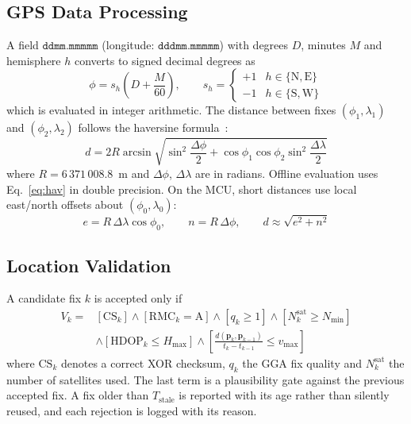 \documentclass[conference]{IEEEtran}
\begin{document}
\subsection{GPS Data Processing}
A field $\mathtt{ddmm.mmmmm}$ (longitude: $\mathtt{dddmm.mmmmm}$) with degrees $D$, minutes $M$ and hemisphere $h$ converts to signed decimal degrees as
\begin{equation}
\phi = s_h\left(D + \frac{M}{60}\right),\qquad s_h=\begin{cases}+1 & h\in\{\mathrm{N},\mathrm{E}\}\\ -1 & h\in\{\mathrm{S},\mathrm{W}\}\end{cases}
\label{eq:dd}
\end{equation}
which is evaluated in integer arithmetic. The distance between fixes $(\phi_1,\lambda_1)$ and $(\phi_2,\lambda_2)$ follows the haversine formula~\cite{sinnott1984}:
\begin{equation}
d = 2R\arcsin\sqrt{\sin^2\frac{\Delta\phi}{2} + \cos\phi_1\cos\phi_2\sin^2\frac{\Delta\lambda}{2}}
\label{eq:hav}
\end{equation}
where $R=6\,371\,008.8$~m and $\Delta\phi$, $\Delta\lambda$ are in radians. Offline evaluation uses Eq.~\eqref{eq:hav} in double precision. On the MCU, short distances use local east/north offsets about $(\phi_0,\lambda_0)$:
\begin{equation}
e = R\,\Delta\lambda\cos\phi_0,\qquad n = R\,\Delta\phi,\qquad d\approx\sqrt{e^2+n^2}
\label{eq:enu}
\end{equation}

\subsection{Location Validation}
A candidate fix $k$ is accepted only if
\begin{equation}
\begin{aligned}
V_k = {}& [\mathrm{CS}_k] \wedge [\mathrm{RMC}_k{=}\mathrm{A}] \wedge [q_k \geq 1] \wedge [N^{\mathrm{sat}}_k \geq N_{\min}]\\
& \wedge [\mathrm{HDOP}_k \leq H_{\max}] \wedge \left[\frac{d(\mathbf{p}_k,\mathbf{p}_{k-1})}{t_k - t_{k-1}} \leq v_{\max}\right]
\end{aligned}
\label{eq:valid}
\end{equation}
where $\mathrm{CS}_k$ denotes a correct XOR checksum, $q_k$ the GGA fix quality and $N^{\mathrm{sat}}_k$ the number of satellites used. The last term is a plausibility gate against the previous accepted fix. A fix older than $T_{\mathrm{stale}}$ is reported with its age rather than silently reused, and each rejection is logged with its reason.
\end{document}
